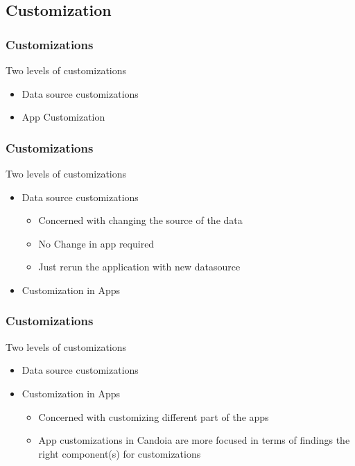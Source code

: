     \subsection{Customization}
        \begin{frame}
        \frametitle{Customizations}
            Two levels of customizations
            \begin{itemize}
                \item Data source customizations
                \item App Customization
            \end{itemize}
        \end{frame}

        \begin{frame}
        \frametitle{Customizations}
            Two levels of customizations
            \begin{itemize}
                \item Data source customizations
                    \begin{itemize}
                        \item Concerned with changing the source of the data
                        \item No Change in app required
                        \item Just rerun the application with new datasource
                    \end{itemize}
                \item Customization in Apps
            \end{itemize}
        \end{frame}

        \begin{frame}
        \frametitle{Customizations}
            Two levels of customizations
            \begin{itemize}
                \item Data source customizations
                \item Customization in Apps
                    \begin{itemize}
                        \item Concerned with customizing different part of the apps
                        \item App customizations in Candoia are more focused in terms of findings the right component(s) for customizations
                    \end{itemize}
            \end{itemize}
        \end{frame}

